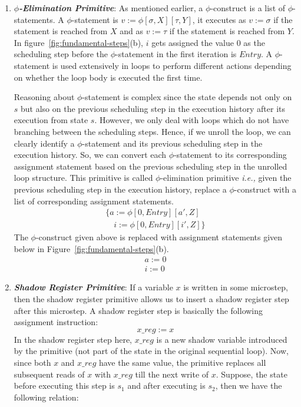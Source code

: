 \begin{enumerate}
\item \textbf{\emph{$\phi$-Elimination Primitive}}: As mentioned earlier, a $\phi$-construct is a list of $\phi$-statements.
A $\phi$-statement is $v := \phi [\sigma, X] [\tau, Y] $, it executes as $ v := \sigma$ if the statement is reached from $X$ and as $ v := \tau$ if the statement is reached from $Y$. In figure~\ref{fig:fundamental-steps}(b), $i$ gets assigned the value $0$ as the scheduling step before the $\phi$-statement in the first iteration is $Entry$. A $\phi$-statement is used extensively in loops to perform different actions depending on whether the loop body is executed the first time. 

Reasoning about $\phi$-statement is complex since the state depends not only on $s$ but also on the previous scheduling step in the execution history after its execution from state $s$. However, 
we only deal with loops which do not have branching between the scheduling steps. Hence, if we unroll the loop, we can clearly identify a $\phi$-statement and its previous scheduling step in the execution history. So, we can convert each $\phi$-statement to its corresponding assignment statement based on the previous scheduling step in the unrolled loop structure. This primitive is called $\phi$-elimination primitive {\em i.e.,} given the previous scheduling step in the execution history, replace a $\phi$-construct with a list of corresponding assignment statements. 
\begin{gather*}
\{   a := \phi [0, Entry] [a', Z] \\ 
     \,\,\,\,\,\,i := \phi [0, Entry] [i', Z]   \} 
\end{gather*}
The $\phi$-construct given above is replaced with assignment statements given below in Figure~\ref{fig:fundamental-steps}(b).
\begin{gather*}
a := 0 \\
i := 0  
\end{gather*}

\medskip
\item \textbf{\emph{Shadow Register Primitive}}: If a variable $x$ is written in some microstep, then the shadow register primitive allows us to insert a shadow register step after this microstep. A shadow register step is basically the following assignment instruction: 
$$x\_reg := x$$ 
In the shadow register step here, $x\_reg$ is a new shadow variable introduced by the primitive (not part of the state in the original sequential loop). Now, since both $x$ and $x\_reg$ have the same value, the primitive replaces all subsequent reads of $x$ with $x\_reg$ till the next write of $x$. Suppose, the state before executing this step is $s_1$ and after executing is $s_2$, then we have the following relation:


\end{enumerate}
